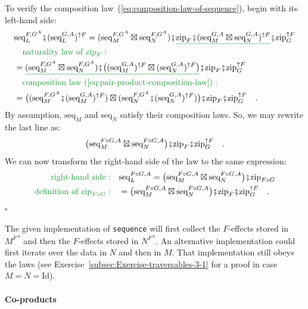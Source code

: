 To verify the composition law~(\ref{eq:composition-law-of-sequence}),
begin with its left-hand side:
\begin{align*}
 & \text{seq}_{L}^{F,G^{A}}\bef(\text{seq}_{L}^{G,A})^{\uparrow F}=(\text{seq}_{M}^{F,G^{A}}\boxtimes\text{seq}_{N}^{F,G^{A}})\bef\gunderline{\text{zip}_{F}\bef(\text{seq}_{M}^{G,A}\boxtimes\text{seq}_{N}^{G,A})^{\uparrow F}}\bef\text{zip}_{G}^{\uparrow F}\\
 & \quad{\color{greenunder}\text{naturality law of }\text{zip}_{F}:}\quad\\
 & =\gunderline{(\text{seq}_{M}^{F,G^{A}}\boxtimes\text{seq}_{N}^{F,G^{A}})\bef\big((\text{seq}_{M}^{G,A})^{\uparrow F}\boxtimes(\text{seq}_{N}^{G,A})^{\uparrow F}\big)}\bef\text{zip}_{F}\bef\text{zip}_{G}^{\uparrow F}\\
 & \quad{\color{greenunder}\text{composition law~(\ref{eq:pair-product-composition-law})}:}\quad\\
 & =\big((\text{seq}_{M}^{F,G^{A}}\bef(\text{seq}_{M}^{G,A})^{\uparrow F})\boxtimes(\text{seq}_{N}^{F,G^{A}}\bef(\text{seq}_{N}^{G,A})^{\uparrow F})\big)\bef\text{zip}_{F}\bef\text{zip}_{G}^{\uparrow F}\quad.
\end{align*}
By assumption, $\text{seq}_{M}$ and $\text{seq}_{N}$ satisfy their
composition laws. So, we may rewrite the last line as:
\[
\big(\text{seq}_{M}^{F\circ G,A}\boxtimes\text{seq}_{N}^{F\circ G,A}\big)\bef\text{zip}_{F}\bef\text{zip}_{G}^{\uparrow F}\quad.
\]
We can now transform the right-hand side of the law to the same expression:
\begin{align*}
{\color{greenunder}\text{right-hand side}:}\quad & \text{seq}_{L}^{F\circ G,A}=\big(\text{seq}_{M}^{F\circ G,A}\boxtimes\text{seq}_{N}^{F\circ G,A}\big)\bef\text{zip}_{F\circ G}\\
{\color{greenunder}\text{definition of }\text{zip}_{F\circ G}:}\quad & =\big(\text{seq}_{M}^{F\circ G,A}\boxtimes\text{seq}_{N}^{F\circ G,A}\big)\bef\text{zip}_{F}\bef\text{zip}_{G}^{\uparrow F}\quad.
\end{align*}
$\square$

The given implementation of \lstinline!sequence! will first collect
the $F$-effects stored in $M^{F^{A}}$ and then the $F$-effects
stored in $N^{F^{A}}$. An alternative implementation could first
iterate over the data in $N$ and then in $M$. That implementation
still obeys the laws (see Exercise~\ref{subsec:Exercise-traversables-3-1}
for a proof in case $M=N=\text{Id}$).

\paragraph{Co-products}

